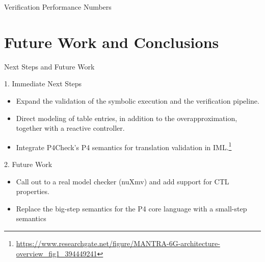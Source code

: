 \begin{frame}{Verification Performance Numbers}
  \vspace{0.6em}
\end{frame}

\section{Future Work and Conclusions}

\begin{frame}{Next Steps and Future Work}
  \vspace{0.4em}

  \begin{block}{1. Immediate Next Steps}
    \begin{itemize}
      \item Expand the validation of the symbolic execution and the verification pipeline.
      \item Direct modeling of table entries, in addition to the overapproximation, together with a reactive controller.
      \item Integrate P4Check's P4 semantics for translation validation in IML.\footnote{\url{https://www.researchgate.net/figure/MANTRA-6G-architecture-overview_fig1_394449241}}
    \end{itemize}
  \end{block}

  \vspace{0.6em}

  \begin{block}{2. Future Work}
        \begin{itemize}
     \item Call out to a real model checker (nuXmv) and add support for CTL properties.
     \item Replace the big-step semantics for the P4 core language with a small-step semantics
        \end{itemize}
  \end{block}

  \vspace{0.6em}

\end{frame}

